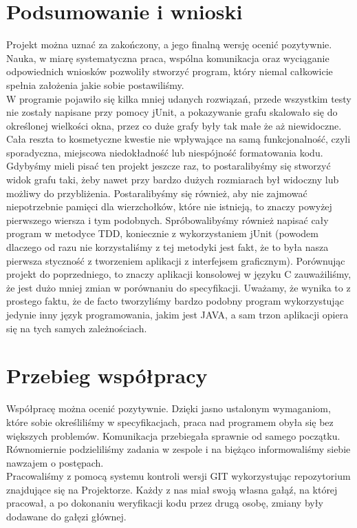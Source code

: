 \documentclass{article}
\begin{document}
\section{Podsumowanie i wnioski}
 Projekt można uznać za zakończony, a jego finalną wersję ocenić pozytywnie. Nauka, w miarę systematyczna praca, wspólna komunikacja oraz wyciąganie odpowiednich wniosków pozwoliły stworzyć program, który niemal całkowicie spełnia założenia jakie sobie postawiliśmy. \\ 
W programie pojawiło się kilka mniej udanych rozwiązań, przede wszystkim testy nie zostały napisane przy pomocy jUnit, a pokazywanie grafu skalowało się do określonej wielkości okna, przez co duże grafy były tak małe że aż niewidoczne. Cała reszta to kosmetyczne kwestie nie wpływające na samą funkcjonalność, czyli sporadyczna, miejscowa niedokładność lub niespójność formatowania kodu. \\ 
Gdybyśmy mieli pisać ten projekt jeszcze raz, to postaralibyśmy się stworzyć widok grafu taki, żeby nawet przy bardzo dużych rozmiarach był widoczny lub możliwy do przybliżenia. Postaralibyśmy się również, aby nie zajmować niepotrzebnie pamięci dla wierzchołków, które nie istnieją, to znaczy powyżej pierwszego wiersza i tym podobnych. Spróbowalibyśmy również napisać cały program w metodyce TDD, koniecznie z wykorzystaniem jUnit (powodem dlaczego od razu nie korzystaliśmy z tej metodyki jest fakt, że to była nasza pierwsza styczność z tworzeniem aplikacji z interfejsem graficznym).
Porównując projekt do poprzedniego, to znaczy aplikacji konsolowej w języku C zauważiliśmy, że jest dużo mniej zmian w porównaniu do specyfikacji. Uważamy, że wynika to z prostego faktu, że de facto tworzyliśmy bardzo podobny program wykorzystując jedynie inny język programowania, jakim jest JAVA, a sam trzon aplikacji opiera się na tych samych zależnościach.

\section{Przebieg współpracy}

Współpracę można ocenić pozytywnie. Dzięki jasno ustalonym wymaganiom, które sobie określiliśmy w specyfikacjach, praca nad programem obyła się bez większych problemów. Komunikacja przebiegała sprawnie od samego początku. Równomiernie podzieliliśmy zadania w zespole i na biężąco informowaliśmy siebie nawzajem o postępach. \\
Pracowaliśmy z pomocą systemu kontroli wersji GIT wykorzystując repozytorium znajdujące się na Projektorze. Każdy z nas miał swoją własna gałąź, na której pracował, a po dokonaniu weryfikacji kodu przez drugą osobę, zmiany były dodawane do gałęzi głównej.
\end{document}
